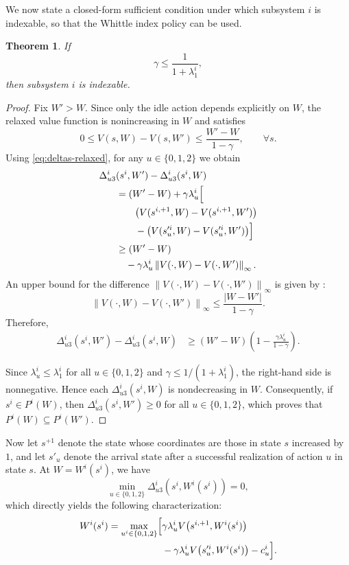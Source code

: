 \documentclass[letterpaper,journal]{IEEEtran}
\newtheorem{theorem}{Theorem}
\begin{document}
We now state a closed-form sufficient condition under which subsystem $i$ is indexable, so that the Whittle index policy can be used.
\begin{theorem}\label{th:indexability}
If
\[
\gamma\leq\frac{1}{1+\lambda^i_1},
\]
then subsystem $i$ is indexable.
\end{theorem}
\begin{proof}
Fix $W'>W$. Since only the idle action depends explicitly on $W$, the relaxed value function is nonincreasing in $W$ and satisfies
\[
0\leq V(s,W)-V(s,W')\leq \frac{W'-W}{1-\gamma},\qquad \forall s.
\]
Using \eqref{eq:deltas-relaxed}, for any $u\in\{0,1,2\}$ we obtain
\begin{align*}
\Delta^i_{u3}&(s^i,W')-\Delta^i_{u3}(s^i,W)\\
&=(W'-W)+\gamma\lambda^i_u\Bigl[\\
&\qquad \bigl(V(s^{i,+1},W)-V(s^{i,+1},W')\bigr)\\
&\qquad-\bigl(V(s^{\prime i}_u,W)-V(s^{\prime i}_u,W')\bigr)\Bigr]\\
&\geq (W'-W)\\
&\quad-\gamma\lambda^i_u\left\|V(\cdot,W)-V(\cdot,W')\right\|_\infty.
\end{align*}
An upper bound for the difference $\left\|V(\cdot,W)-V(\cdot,W')\right\|_\infty$ is given by \cite[Theorem 12]{csaji2008value_function}:
\begin{equation}\label{eq:V-difference-bound}
\left\|V(\cdot,W)-V(\cdot,W')\right\|_\infty \leq \frac{\bigl|W-W'\bigr|}{1-\gamma}.
\end{equation}
Therefore,
\[
\begin{aligned}
\Delta^i_{u3}(s^i,W')-\Delta^i_{u3}(s^i,W)
&\geq (W'-W)\left(1-\frac{\gamma\lambda^i_u}{1-\gamma}\right).
\end{aligned}
\]


Since $\lambda^i_u\leq \lambda^i_1$ for all $u\in\{0,1,2\}$ and $\gamma\leq 1/(1+\lambda^i_1)$, the right-hand side is nonnegative. Hence each $\Delta^i_{u3}(s^i,W)$ is nondecreasing in $W$. Consequently, if $s^i\in P^i(W)$, then $\Delta^i_{u3}(s^i,W')\geq 0$ for all $u\in\{0,1,2\}$, which proves that $P^i(W)\subseteq P^i(W')$.
\end{proof}


Now let $s^{+1}$ denote the state whose coordinates are those in state $s$ increased by $1$, and let $s'_u$ denote the arrival state after a successful realization of action $u$ in state $s$.
At $W=W^i(s^i)$, we have
\[
\min_{u\in\{0,1,2\}}\Delta^i_{u3}(s^i,W^i(s^i))=0,
\]
which directly yields the following characterization:
\begin{equation}\label{eq:whittle-bellman}
\begin{aligned}
W^i(s^i)=\max_{u^i\in\{0,1,2\}}\Bigl[&
\gamma\lambda^i_uV\bigl(s^{i,+1},W^i(s^i)\bigr)\\
&-\gamma\lambda^i_uV\bigl(s^{\prime i}_u,W^i(s^i)\bigr)-c^i_u\Bigr].
\end{aligned}
\end{equation}
\end{document}
